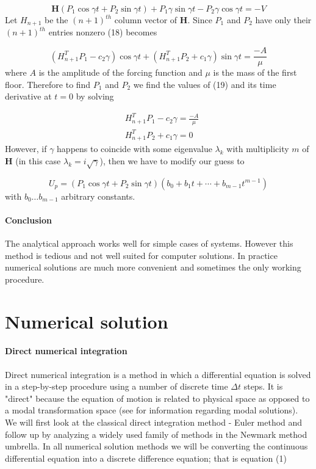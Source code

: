 \documentclass{article}
\begin{document}
				\begin{equation}
					\textbf{H}(P_1\cos{\gamma t} +  P_2\sin{\gamma t}) + P_1\gamma \sin{\gamma t} - P_2\gamma \cos{\gamma t} = -V						
				\end{equation}
Let $H_{n+1}$ be the $(n+1)^{th}$ column vector of \textbf{H}. Since $P_1$ and $P_2$ have only their $(n+1)^{th}$ entries nonzero (18) becomes

				\begin{equation}
					(H_{n+1}^TP_1 - c_2\gamma)\cos{\gamma t} + (H_{n+1}^TP_2+c_1\gamma)\sin{\gamma t} = \frac{-A}{\mu}
				\end{equation}
where $A$ is the amplitude of the forcing function and $\mu$ is the mass of the first floor. Therefore to find $P_1$ and $P_2$ we find the values of (19)  and its time derivative at $t = 0$ by solving

				\begin{align}
					&H_{n+1}^TP_1 - c_2\gamma= \frac{-A}{\mu} \\
					&H_{n+1}^TP_2 + c_1\gamma = 0
				\end{align}
However, if $\gamma$ happens to coincide with some eigenvalue $\lambda_k$  with multiplicity $m$ of $\textbf{H}$ (in this case $\lambda_k = i\sqrt{\gamma}$), then we have to modify our guess to 

				\begin{equation}
					U_p = (P_1\cos{\gamma t} +  P_2\sin{\gamma t})(b_0 + b_1t + \cdots + b_{m-1}t^{m-1})
				\end{equation}
with $b_0 \dots b_{m-1}$ arbitrary constants. 

\paragraph{Conclusion} The analytical approach works well for simple cases of systems. However this method is tedious and not well suited for computer solutions. In practice numerical solutions are much more convenient and sometimes the only working procedure.


\section{Numerical solution}
				\paragraph{Direct numerical integration} Direct numerical integration is a method in which a differential equation is solved in a step-by-step procedure using a number of discrete time $\Delta t$ steps. It is "direct" because the equation of motion is related to physical space as opposed to a modal transformation space (see \cite{Braun} for information regarding modal solutions). We will first look at the classical direct integration method - Euler method and follow up by analyzing a widely used family of methods in the Newmark method umbrella. In all numerical solution methods we will be converting the continuous differential equation into a discrete difference equation; that is equation (1)
				
\end{document}
